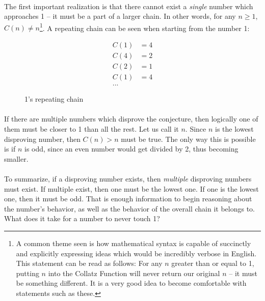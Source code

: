 \documentclass[12pt,letterpaper]{article}
\begin{document}
				\paragraph{} The first important realization is that there cannot exist a \textit{single} number which approaches 1 -- it must be a part of a larger chain. In other words, for any $n \geqslant 1$, $C(n) \neq n$\footnote{A common theme seen is how mathematical syntax is capable of succinctly and explicitly expressing ideas which would be incredibly verbose in English. This statement can be read as follows: For any $n$ greater than or equal to 1, putting $n$ into the Collatz Function will never return our original $n$ -- it must be something different. It is a very good idea to become comfortable with statements such as these.}. A repeating chain can be seen when starting from the number 1:
				
				\begin{figure}[h]
					\begin{align*}
					C(1) &= 4\\
					C(4) &= 2\\
					C(2) &= 1\\
					C(1) &= 4\\
					\text{...}
					\end{align*}
					
					\caption{1's repeating chain}
					\label{chain:1}
				\end{figure}
			
			\paragraph{} If there are multiple numbers which disprove the conjecture, then logically one of them must be closer to 1 than all the rest. Let us call it $n$. Since $n$ is the lowest disproving number, then $C(n) > n$ must be true. The only way this is possible is if $n$ is odd, since an even number would get divided by 2, thus becoming smaller.
			
			\paragraph{} To summarize, if a disproving number exists, then \textit{multiple} disproving numbers must exist. If multiple exist, then one must be the lowest one. If one is the lowest one, then it must be odd. That is enough information to begin reasoning about the number's behavior, as well as the behavior of the overall chain it belongs to. What does it take for a number to never touch 1?
			
\end{document}
